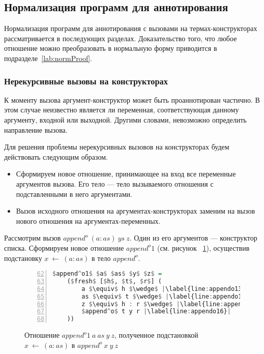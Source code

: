 \subsection{Нормализация программ для аннотирования}
\label{sec:normalize}

Нормализация программ для аннотирования с вызовами на термах-конструкторах рассматривается в последующих разделах.
Доказательство того, что любое отношение \miniKanren{} можно преобразовать в нормальную форму приводится в подразделе~\ref{lab:normProof}.


\subsubsection{Нерекурсивные вызовы на конструкторах}
\label{lab:non-rec}

К моменту вызова аргумент-конструктор может быть проаннотирован частично.
В этом случае неизвестно является ли переменная, соответствующая данному аргументу, входной или выходной.
Другими словами, невозможно определить направление вызова.

Для решения проблемы нерекурсивных вызовов на конструкторах будем действовать следующим образом.
\begin{itemize}
    \item Сформируем новое отношение, принимающее на вход все переменные аргументов вызова. Его тело --- тело вызываемого отношения с подставленными в него аргументами.
    \item Вызов исходного отношения на аргументах-конструкторах заменим на вызов нового отношения на аргументах-переменных. 
\end{itemize}

Рассмотрим вызов $append^o~(a:as)~ys~z$.
Один из его аргументов --- конструктор списка.
Сформируем новое отношение $append^o1$ (см. рисунок ~\ref{lst:appendo1}), осуществив подстановку $x~\gets~(a:as)$ в тело $append^o$.

\begin{figure}[h!]
  \begin{center}
  \begin{minipage}{0.35\textwidth}
  \begin{lstlisting}[language=Haskell, frame=single, numbers=left,numberstyle=\small, firstnumber=62, escapechar=|]
  $append^o1$ $a$ $as$ $y$ $z$ =
    ($fresh$ [$h$, $t$, $r$] (
        a $\equiv$ h $\wedge$ |\label{line:appendo13}|
        as $\equiv$ t $\wedge$ |\label{line:appendo14}|
        z $\equiv$ h : r $\wedge$ |\label{line:appendo15}|
        $append^o$ t y r |\label{line:appendo16}|
    ))
    \end{lstlisting}
  \end{minipage}
  \end{center}
  \caption{Отношение $append^o1 \ a \ as \ y \ z$, полученное подстановкой $x~\gets~(a:as)$ в $append^o \ x \ y \ z$}
  \label{lst:appendo1}
\end{figure}

